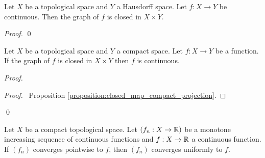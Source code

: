 \begin{proposition}
    \label{proposition:graph_closed}
    Let $X$ be a topological space and $Y$ a Hausdorff space.
    Let $f : X \rightarrow Y$ be continuous. Then the graph of $f$
    is closed in $X \times Y$.
\end{proposition}

\begin{proof}
    \qed
\end{proof}

\begin{theorem}
    Let $X$ be a topological space and $Y$ a compact space. Let $f : X \rightarrow Y$ be a function. 
    If the graph of $f$ is closed in $X \times Y$ then $f$ is continuous.
\end{theorem}

\begin{proof}
    \pf
        \begin{proof}
            \pf\ Proposition \ref{proposition:closed_map_compact_projection}.
        \end{proof}
    \qed
\end{proof}

\begin{theorem}
    Let $X$ be a compact topological space. Let $(f_n : X \rightarrow \mathbb{R})$ be a monotone increasing sequence of continuous functions and $f : X \rightarrow \mathbb{R}$
    a continuous function. If $(f_n)$ converges pointwise to $f$, then $(f_n)$ converges uniformly to $f$.
\end{theorem}

